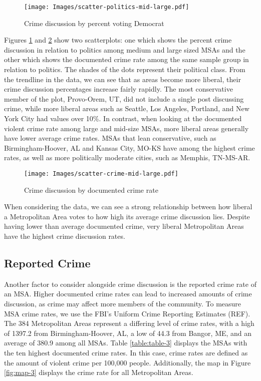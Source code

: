 \documentclass[12pt,oneside, letterpaper]{book}
\begin{document}
\begin{figure}[ht]
    \centering
    \texttt{[image: Images/scatter-politics-mid-large.pdf]}
    \caption{Crime discussion by percent voting Democrat}
    \label{fig:scatter-1}
\end{figure}

\par Figures \ref{fig:scatter-1} and \ref{fig:scatter-2} show two scatterplots: one which shows the percent crime discussion in relation to politics among medium and large sized MSAs and the other which shows the documented crime rate among the same sample group in relation to politics. The shades of the dots represent their political class. From the trendline in the data, we can see that as areas become more liberal, their crime discussion percentages increase fairly rapidly. The most conservative member of the plot, Provo-Orem, UT, did not include a single post discussing crime, while more liberal areas such as Seattle, Los Angeles, Portland, and New York City had values over 10\%. In contrast, when looking at the documented violent crime rate among large and mid-size MSAs, more liberal areas generally have lower average crime rates. MSAs that lean conservative, such as Birmingham-Hoover, AL and Kansas City, MO-KS have among the highest crime rates, as well as more politically moderate cities, such as Memphis, TN-MS-AR.

\begin{figure}[ht]
    \centering
    \texttt{[image: Images/scatter-crime-mid-large.pdf]}
    \caption{Crime discussion by documented crime rate}
    \label{fig:scatter-2}
\end{figure}

\par When considering the data, we can see a strong relationship between how liberal a Metropolitan Area votes to how high its average crime discussion lies. Despite having lower than average documented crime, very liberal Metropolitan Areas have the highest crime discussion rates.

\subsection{Reported Crime}

\par Another factor to consider alongside crime discussion is the reported crime rate of an MSA. Higher documented crime rates can lead to increased amounts of crime discussion, as crime may affect more members of the community. To measure MSA crime rates, we use the FBI's Uniform Crime Reporting Estimates (REF). The 384 Metropolitan Areas represent a differing level of crime rates, with a high of 1397.2 from Birmingham-Hoover, AL, a low of 44.3 from Bangor, ME, and an average of 380.9 among all MSAs. Table \ref{table:table-3} displays the MSAs with the ten highest documented crime rates. In this case, crime rates are defined as the amount of violent crime per 100,000 people. Additionally, the map in Figure \ref{fig:map-3} displays the crime rate for all Metropolitan Areas.
\end{document}
